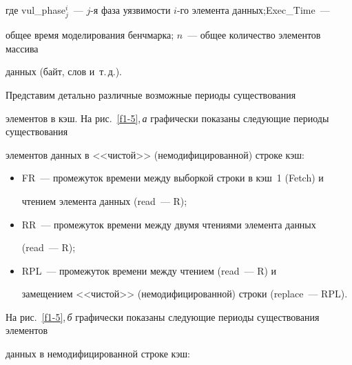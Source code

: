 где vul\_phase$^i_j$~--- $j$-я фаза уязвимости $i$-го элемента данных;\linebreak Exec\_Time~--- 


общее время моделирования бенчмарка; $n$~--- общее количество элементов массива 


данных (байт, слов и~т.\,д.).





      Представим детально различные возможные периоды существования 


элементов в кэш. На рис.~\ref{f1-5},\,\textit{а} графически показаны  следующие периоды существования 


элементов данных в <<чистой>> (немодифицированной) строке кэш: 


          \begin{itemize}


\item FR~--- промежуток времени между выборкой строки в кэш~1 (Fetch) и 


чтением элемента  данных (read~--- R);


\item RR~--- промежуток времени между двумя чтениями элемента  данных 


(read~--- R);


\item RPL~---  промежуток времени между  чтением (read~--- R) и 


замещением <<чистой>> (немодифицированной) строки (replace~--- RPL).


\end{itemize}


          





          На рис.~\ref{f1-5},\,\textit{б} графически показаны  следующие периоды существования элементов 


данных в немодифицированной строке кэш:


